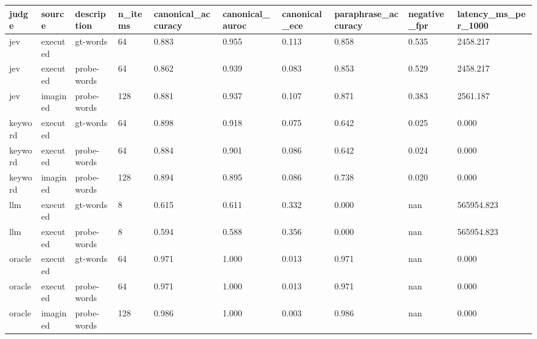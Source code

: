 \begin{tabular}{llllllllll}
\toprule
judge & source & description & n\_items & canonical\_accuracy & canonical\_auroc & canonical\_ece & paraphrase\_accuracy & negative\_fpr & latency\_ms\_per\_1000 \\
\midrule
jev & executed & gt-words & 64 & 0.883 & 0.955 & 0.113 & 0.858 & 0.535 & 2458.217 \\
jev & executed & probe-words & 64 & 0.862 & 0.939 & 0.083 & 0.853 & 0.529 & 2458.217 \\
jev & imagined & probe-words & 128 & 0.881 & 0.937 & 0.107 & 0.871 & 0.383 & 2561.187 \\
keyword & executed & gt-words & 64 & 0.898 & 0.918 & 0.075 & 0.642 & 0.025 & 0.000 \\
keyword & executed & probe-words & 64 & 0.884 & 0.901 & 0.086 & 0.642 & 0.024 & 0.000 \\
keyword & imagined & probe-words & 128 & 0.894 & 0.895 & 0.086 & 0.738 & 0.020 & 0.000 \\
llm & executed & gt-words & 8 & 0.615 & 0.611 & 0.332 & 0.000 & nan & 565954.823 \\
llm & executed & probe-words & 8 & 0.594 & 0.588 & 0.356 & 0.000 & nan & 565954.823 \\
oracle & executed & gt-words & 64 & 0.971 & 1.000 & 0.013 & 0.971 & nan & 0.000 \\
oracle & executed & probe-words & 64 & 0.971 & 1.000 & 0.013 & 0.971 & nan & 0.000 \\
oracle & imagined & probe-words & 128 & 0.986 & 1.000 & 0.003 & 0.986 & nan & 0.000 \\
\bottomrule
\end{tabular}